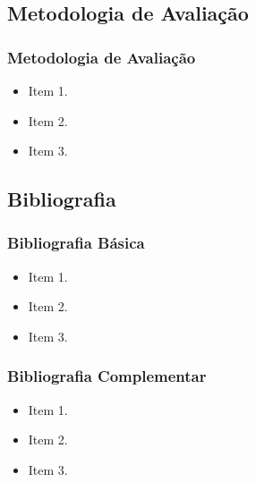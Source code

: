 \subsection[Metodologia de Avaliação]{Metodologia de Avaliação}\label{subsec:ementa-metodologia-avaliacao}



\begin{frame}[t]\frametitle{Metodologia de Avaliação}

  \begin{itemize}
    \justifying{}
    \setlength\itemsep{1em}
    \item Item 1.
    \item Item 2.
    \item Item 3.
  \end{itemize}

\end{frame}



\subsection[Bibliografia]{Bibliografia}\label{subsec:ementa-bibliografia}



\begin{frame}[t]\frametitle{Bibliografia Básica}

  \begin{itemize}
    \justifying{}
    \setlength\itemsep{1em}
    \item Item 1.
    \item Item 2.
    \item Item 3.
  \end{itemize}

\end{frame}



\begin{frame}[t]\frametitle{Bibliografia Complementar}

  \begin{itemize}
    \justifying{}
    \setlength\itemsep{1em}
    \item Item 1.
    \item Item 2.
    \item Item 3.
  \end{itemize}

\end{frame}
